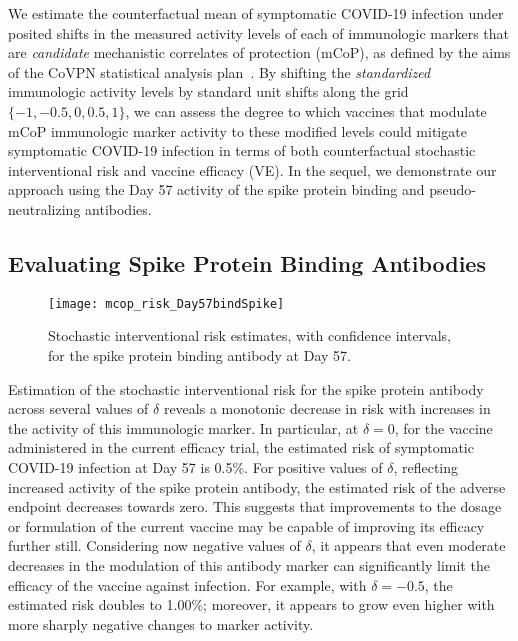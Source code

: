 We estimate the counterfactual mean of symptomatic COVID-19 infection under
posited shifts in the measured activity levels of each of immunologic markers
that are \emph{candidate} mechanistic correlates of protection (mCoP), as
defined by the aims of the CoVPN statistical analysis
plan~\citep{gilbert2021covpn}. By shifting the \emph{standardized} immunologic
activity levels by standard unit shifts along the grid $\{-1, -0.5, 0, 0.5,
1\}$, we can assess the degree to which vaccines that modulate mCoP immunologic
marker activity to these modified levels could mitigate symptomatic COVID-19
infection in terms of both counterfactual stochastic interventional risk and
vaccine efficacy (VE). In the sequel, we demonstrate our approach using the Day
57 activity of the spike protein binding and pseudo-neutralizing antibodies.

\subsection{Evaluating Spike Protein Binding Antibodies}\label{spba-day57}

\begin{figure}[H]
  \centering
  \texttt{[image: mcop\_risk\_Day57bindSpike]}
  \caption{Stochastic interventional risk estimates, with confidence intervals,
  for the spike protein binding antibody at Day 57.}
  \label{fig:marker1-risk-day57}
\end{figure}

Estimation of the stochastic interventional risk for the spike protein antibody
across several values of $\delta$ reveals a monotonic decrease in risk
with increases in the activity of this immunologic marker. In particular, at
$\delta = 0$, for the vaccine administered in the current efficacy trial, the
estimated risk of symptomatic COVID-19 infection at Day 57 is 0.5\%. For
positive values of $\delta$, reflecting increased activity of the spike protein
antibody, the estimated risk of the adverse endpoint decreases towards zero.
This suggests that improvements to the dosage or formulation of the current
vaccine may be capable of improving its efficacy further still. Considering now
negative values of $\delta$, it appears that even moderate decreases in the
modulation of this antibody marker can significantly limit the efficacy of the
vaccine against infection. For example, with $\delta = -0.5$, the estimated risk
doubles to 1.00\%; moreover, it appears to grow even higher with more sharply
negative changes to marker activity.

